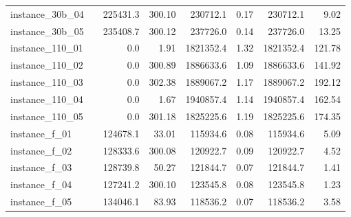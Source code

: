 \documentclass[12pt,a4paper,openright,twoside]{book}
\begin{document}
\begin{table}[H]
{\begin{tabular}{|ll|rr|rr|rr|}
 instance\_30b\_04             &     &   225431.3 &   300.10 &   230712.1 &     0.17 &   230712.1 &     9.02 \\  
 instance\_30b\_05             &     &   235408.7 &   300.12 &   237726.0 &     0.14 &   237726.0 &    13.25 \\  
 instance\_110\_01            &     &        0.0 &     1.91 &  1821352.4 &     1.32 &  1821352.4 &   121.78 \\  
 instance\_110\_02            &     &        0.0 &   300.89 &  1886633.6 &     1.09 &  1886633.6 &   141.92 \\  
 instance\_110\_03            &     &        0.0 &   302.38 &  1889067.2 &     1.17 &  1889067.2 &   192.12 \\  
 instance\_110\_04            &     &        0.0 &     1.67 &  1940857.4 &     1.14 &  1940857.4 &   162.54 \\  
 instance\_110\_05            &     &        0.0 &   301.18 &  1825225.6 &     1.19 &  1825225.6 &   174.35 \\  
 instance\_f\_01              &     &   124678.1 &    33.01 &   115934.6 &     0.08 &   115934.6 &     5.09 \\  
 instance\_f\_02              &     &   128333.6 &   300.08 &   120922.7 &     0.09 &   120922.7 &     4.52 \\  
 instance\_f\_03              &     &   128739.8 &    50.27 &   121844.7 &     0.07 &   121844.7 &     1.41 \\  
 instance\_f\_04              &     &   127241.2 &   300.10 &   123545.8 &     0.08 &   123545.8 &     1.23 \\  
 instance\_f\_05              &     &   134046.1 &    83.93 &   118536.2 &     0.07 &   118536.2 &     3.58 \\  
  \hline
\end{tabular}
}
\end{table}
\end{document}
